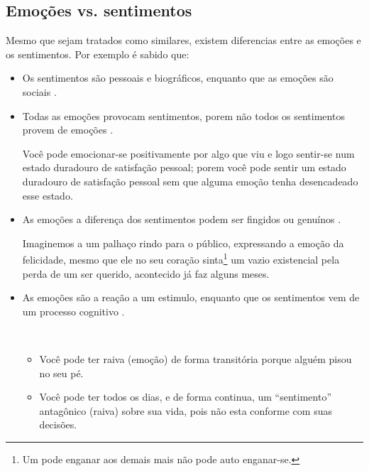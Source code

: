 \subsection{Emoções vs. sentimentos}
\label{ref:emotionsentimental}
Mesmo que sejam tratados como similares, 
existem diferencias entre as emoções e os sentimentos.
Por exemplo é sabido que:
\begin{itemize}
%
\item Os sentimentos são pessoais e biográficos, enquanto que as emoções são sociais \cite[pp. 42]{hofman2015affective}.
%
\item Todas as emoções provocam sentimentos, porem não todos os sentimentos provem de emoções
\cite[pp. 288]{zanelli2014psicologia} \cite{freitas2015codigo}.
\begin{example}
Você pode emocionar-se positivamente por algo que viu e logo sentir-se num estado duradouro de satisfação pessoal;
porem você pode sentir um estado duradouro de satisfação pessoal sem que alguma emoção tenha desencadeado esse estado.
\end{example}
%
\item As emoções a diferença dos sentimentos podem ser fingidos ou genuínos \cite[pp. 32]{nicolas2018musicas}.
\begin{example}[Ri palhaço\, ri:]
Imaginemos a um palhaço rindo para o público, expressando a emoção da felicidade,
mesmo que ele no seu coração sinta\footnote{Um pode enganar aos demais mais não pode auto enganar-se.} 
um vazio existencial pela perda de um ser querido,
acontecido já faz alguns meses.
\end{example}
\item As emoções são a reação a um estimulo, enquanto que os sentimentos vem de um processo cognitivo \cite{freitas2013psicologia}.
\begin{example} ~

\begin{itemize}
\item Você pode ter raiva (emoção) de forma transitória porque alguém pisou no seu pé.
\item Você pode ter todos os dias, e de forma continua, um ``sentimento'' antagônico (raiva) sobre sua vida, 
pois não esta conforme com suas decisões.
\end{itemize}
\end{example}
\end{itemize}

